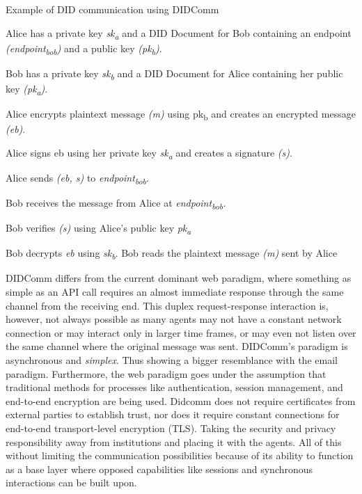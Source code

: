\begin{algorithm}[H]
\caption{Example of DID communication using DIDComm \cite{Abramson_2020}}
\label{alg:didcomm_example}
  \begin{algorithmic}[1]
    \State Alice has a private key \emph{sk\textsubscript{a}} and a DID Document for Bob containing an endpoint \emph{(endpoint\textsubscript{bob})} and a public key \emph{(pk\textsubscript{b})}.

    \State Bob has a private key \emph{sk\textsubscript{b}} and a DID Document for Alice containing her public key \emph{(pk\textsubscript{a})}.

    \State Alice encrypts plaintext message \emph{(m)} using pk\textsubscript{b} and creates an encrypted message \emph{(eb)}.

    \State Alice signs eb using her private key \emph{sk\textsubscript{a}} and creates a signature \emph{(s)}.

    \State Alice sends \emph{(eb, s)} to \emph{endpoint\textsubscript{bob}}.

    \State Bob receives the message from Alice at \emph{{endpoint\textsubscript{bob}}.}

    \State Bob verifies \emph{(s)} using Alice's public key \emph{pk\textsubscript{a}}

    \State Bob decrypts \emph{eb} using \emph{sk\textsubscript{b}}.
    \State Bob reads the plaintext message \emph{(m)} sent by Alice
    \EndIf
  \end{algorithmic}
\end{algorithm}



DIDComm differs from the current dominant web paradigm, where something as simple as an API call requires an almost immediate response through the same channel from the receiving end. This duplex request-response interaction is, however, not always possible as many agents may not have a constant network connection or may interact only in larger time frames, or may even not listen over the same channel where the original message was sent. DIDComm's paradigm is asynchronous and \emph{simplex}. Thus showing a bigger resemblance with the email paradigm. Furthermore, the web paradigm goes under the assumption that traditional methods for processes like authentication, session management, and end-to-end encryption are being used. Didcomm does not require certificates from external parties to establish trust, nor does it require constant connections for end-to-end transport-level encryption (TLS). Taking the security and privacy responsibility away from institutions and placing it with the agents. All of this without limiting the communication possibilities because of its ability to function as a base layer where opposed capabilities like sessions and synchronous interactions can be built upon. \cite{curren_looker_terbu_2020}

